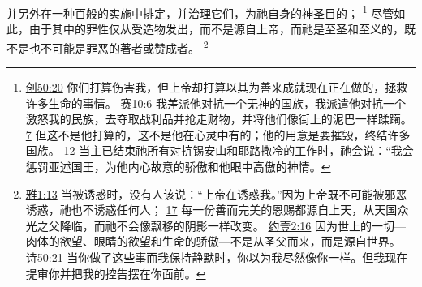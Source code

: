 \documentclass[12pt, a4paper, oneside]{ctexart}
\begin{document}
	并另外在一种百般的实施中排定，并治理它们，为祂自身的神圣目的；
	\footnote {
		\href{https://biblehub.com/genesis/50-20.htm}{创50:20} 你们打算伤害我，但上帝却打算以其为善来成就现在正在做的，拯救许多生命的事情。
		\href{https://biblehub.com/isaiah/10-6.htm}{赛10:6} 我差派他对抗一个无神的国族，我派遣他对抗一个激怒我的民族，去夺取战利品并抢走财物，并将他们像街上的泥巴一样蹂躏。
		\href{https://biblehub.com/isaiah/10-7.htm}{7} 但这不是他打算的，这不是他在心灵中有的；他的用意是要摧毁，终结许多国族。
		\href{https://biblehub.com/isaiah/10-12.htm}{12} 当主已结束祂所有对抗锡安山和耶路撒冷的工作时，祂会说：“我会惩罚亚述国王，为他内心故意的骄傲和他眼中高傲的神情。
	}
	尽管如此，由于其中的罪性仅从受造物发出，而不是源自上帝，而祂是至圣和至义的，既不是也不可能是罪恶的著者或赞成者。
	\footnote {
		\href{https://biblehub.com/james/1-13.htm}{雅1:13} 当被诱惑时，没有人该说：“上帝在诱惑我。”因为上帝既不可能被邪恶诱惑，祂也不诱惑任何人；
		\href{https://biblehub.com/james/1-17.htm}{17} 每一份善而完美的恩赐都源自上天，从天国众光之父降临，而祂不会像飘移的阴影一样改变。
		\href{https://biblehub.com/1_john/2-16.htm}{约壹2:16} 因为世上的一切---肉体的欲望、眼睛的欲望和生命的骄傲---不是从圣父而来，而是源自世界。
		\href{https://biblehub.com/psalms/50-21.htm}{诗50:21} 当你做了这些事而我保持静默时，你以为我尽然像你一样。但我现在提审你并把我的控告摆在你面前。
	}
\end{document}
